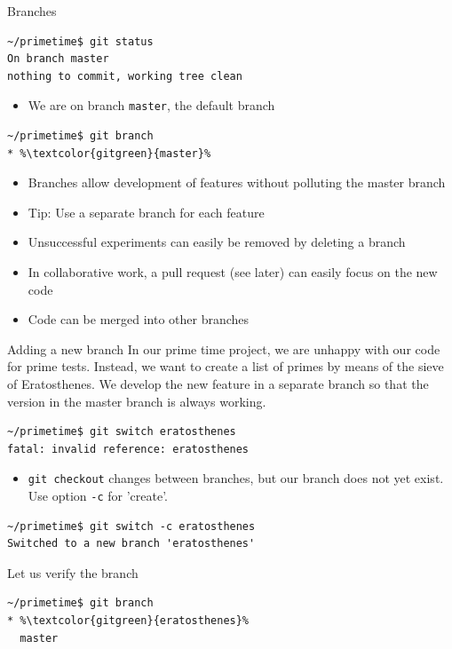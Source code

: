\documentclass[svgnames]{beamer}
\begin{document}
\begin{frame}[fragile]{Branches}
 \begin{lstlisting}
~/primetime$ git status
On branch master
nothing to commit, working tree clean
 \end{lstlisting}
 \begin{itemize}
  \item We are on branch \texttt{master}, the default branch
 \end{itemize}
 \begin{lstlisting}[escapechar=\%]
~/primetime$ git branch
* %\textcolor{gitgreen}{master}%
 \end{lstlisting}
 \begin{itemize}
  \item Branches allow development of features without polluting
        the master branch
  \item Tip: Use a separate branch for each feature
  \item Unsuccessful experiments can easily be removed by deleting
        a branch
  \item In collaborative work, a pull request (see later) can easily
        focus on the new code
  \item Code can be merged into other branches
 \end{itemize}
\end{frame}

\begin{frame}[fragile]{Adding a new branch}
 In our prime time project, we are unhappy with our code for prime tests.
 Instead, we want to create a list of primes by means of the sieve of
 Eratosthenes. We develop the new feature in a separate branch so that the
 version in the master branch is always working.

 \begin{lstlisting}[breaklines=true]
~/primetime$ git switch eratosthenes
fatal: invalid reference: eratosthenes
 \end{lstlisting}
 \begin{itemize}
  \item \texttt{git checkout} changes between branches, but our branch
        does not yet exist. Use option \texttt{-c} for 'create'.
 \end{itemize}
 \begin{lstlisting}
~/primetime$ git switch -c eratosthenes
Switched to a new branch 'eratosthenes'
 \end{lstlisting}

 \vspace{0.2truecm}
 Let us verify the branch
 \begin{lstlisting}[escapechar=\%]
~/primetime$ git branch
* %\textcolor{gitgreen}{eratosthenes}%
  master
 \end{lstlisting}
\end{frame}
\end{document}
